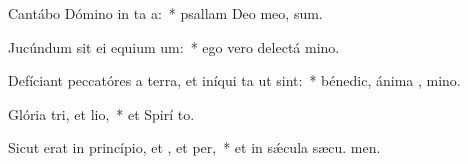 \item Cantábo Dómino in ta a:~* psallam Deo meo,  sum.
\item Jucúndum sit ei equium um:~* ego vero delectá  mino.
\item Defíciant peccatóres a terra, et iníqui ta ut  sint:~* bénedic, ánima , mino.
\item Glória tri, et lio,~* et Spirí to.
\item Sicut erat in princípio, et , et per,~* et in sǽcula sæcu. men.
